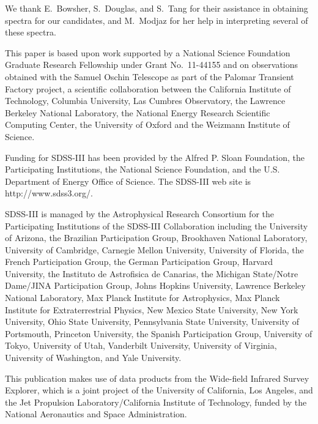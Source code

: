 \documentclass{emulateapj}
\begin{document}

\acknowledgments
We thank E.~Bowsher, S.~Douglas, and S.~Tang for their assistance in obtaining spectra for our candidates, and M.~Modjaz for her help in interpreting several of these spectra.

This paper is based upon work supported by a National Science Foundation Graduate Research Fellowship under Grant No.\ 11-44155 and on observations obtained with the Samuel Oschin Telescope as part of the Palomar Transient Factory project, a scientific collaboration between the California Institute of Technology, Columbia University, Las Cumbres Observatory, the Lawrence Berkeley National Laboratory, the National Energy Research Scientific Computing Center, the University of Oxford and the Weizmann Institute of Science. 

Funding for SDSS-III has been provided by the Alfred P. Sloan Foundation, the Participating Institutions, the National Science Foundation, and the U.S. Department of Energy Office of Science. The SDSS-III web site is http://www.sdss3.org/.

SDSS-III is managed by the Astrophysical Research Consortium for the Participating Institutions of the SDSS-III Collaboration including the University of Arizona, the Brazilian Participation Group, Brookhaven National Laboratory, University of Cambridge, Carnegie Mellon University, University of Florida, the French Participation Group, the German Participation Group, Harvard University, the Instituto de Astrofisica de Canarias, the Michigan State/Notre Dame/JINA Participation Group, Johns Hopkins University, Lawrence Berkeley National Laboratory, Max Planck Institute for Astrophysics, Max Planck Institute for Extraterrestrial Physics, New Mexico State University, New York University, Ohio State University, Pennsylvania State University, University of Portsmouth, Princeton University, the Spanish Participation Group, University of Tokyo, University of Utah, Vanderbilt University, University of Virginia, University of Washington, and Yale University. 

This publication makes use of data products from the Wide-field Infrared Survey Explorer, which is a joint project of the University of California, Los Angeles, and the Jet Propulsion Laboratory/California Institute of Technology, funded by the National Aeronautics and Space Administration.
\end{document}
